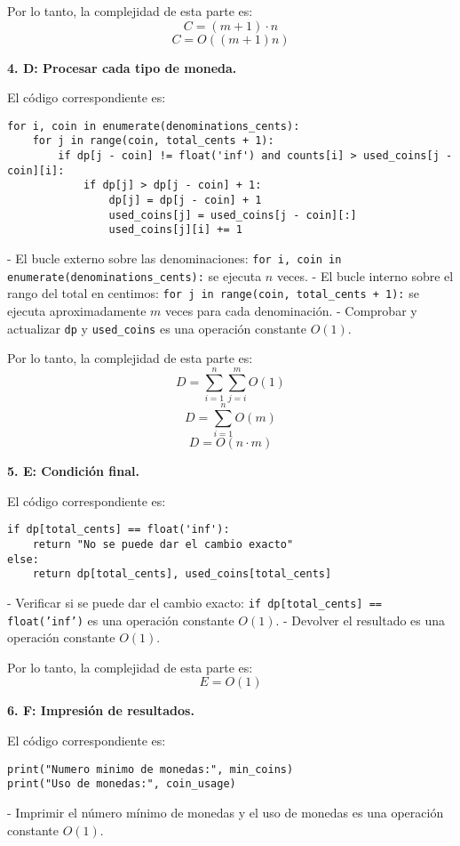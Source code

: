 Por lo tanto, la complejidad de esta parte es:
\[ C = (m+1) \cdot n \]
\[ C = O((m+1)n) \]

 \textbf{4. D: Procesar cada tipo de moneda.}

El código correspondiente es:
\begin{lstlisting}
for i, coin in enumerate(denominations_cents):
    for j in range(coin, total_cents + 1):
        if dp[j - coin] != float('inf') and counts[i] > used_coins[j - coin][i]:
            if dp[j] > dp[j - coin] + 1:
                dp[j] = dp[j - coin] + 1
                used_coins[j] = used_coins[j - coin][:]
                used_coins[j][i] += 1
\end{lstlisting}

- El bucle externo sobre las denominaciones: \texttt{for i, coin in enumerate(denominations\_cents):} se ejecuta \( n \) veces.
- El bucle interno sobre el rango del total en centimos: \texttt{for j in range(coin, total\_cents + 1):} se ejecuta aproximadamente \( m \) veces para cada denominación.
- Comprobar y actualizar \texttt{dp} y \texttt{used\_coins} es una operación constante \( O(1) \).

Por lo tanto, la complejidad de esta parte es:
\[ D = \sum_{i=1}^{n} \sum_{j=i}^{m} O(1) \]
\[ D = \sum_{i=1}^{n} O(m) \]
\[ D = O(n \cdot m) \]

\textbf{5. E: Condición final.}

El código correspondiente es:
\begin{lstlisting}
if dp[total_cents] == float('inf'):
    return "No se puede dar el cambio exacto"
else:
    return dp[total_cents], used_coins[total_cents]
\end{lstlisting}

- Verificar si se puede dar el cambio exacto: \texttt{if dp[total\_cents] == float('inf')} es una operación constante \( O(1) \).
- Devolver el resultado es una operación constante \( O(1) \).

Por lo tanto, la complejidad de esta parte es:
\[ E = O(1) \]

\textbf{6. F: Impresión de resultados.}

El código correspondiente es:
\begin{lstlisting}
print("Numero minimo de monedas:", min_coins)
print("Uso de monedas:", coin_usage)
\end{lstlisting}

- Imprimir el número mínimo de monedas y el uso de monedas es una operación constante \( O(1) \).

